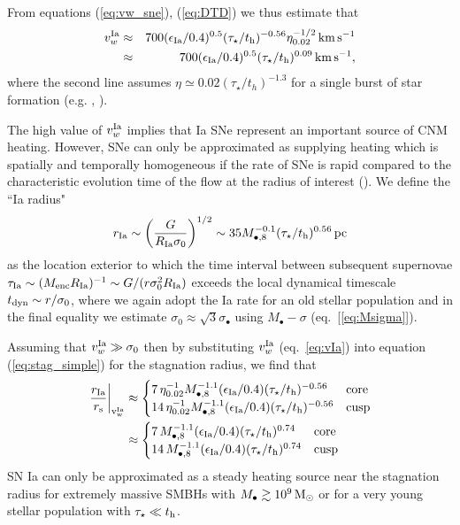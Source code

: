\documentclass[usenatbib,fleqn]{mn2e}
\begin{document}
From equations (\ref{eq:vw_sne}), (\ref{eq:DTD}) we thus estimate that 
  \begin{eqnarray} 
    v_{w}^{\rm Ia} &\approx& 700(\epsilon_{\rm
      Ia}/0.4)^{0.5}(\tau_{\star}/t_{\rm h})^{-0.56}\eta_{0.02}^{-1/2}\,{\rm km
      \,s^{-1}} \nonumber \\
&\approx& 700(\epsilon_{\rm
      Ia}/0.4)^{0.5}(\tau_{\star}/t_{\rm h})^{0.09}\,{\rm km
      \,s^{-1}},
\label{eq:vIa}
  \end{eqnarray}
  where the second line assumes $\eta\simeq 0.02
  (\tau_{\star}/t_h)^{-1.3}$ for a single burst of star formation
  (e.g. , \citealt{Ciotti+91}).

The high value of $v_{w}^{\rm Ia}$ implies that Ia SNe represent an
important source of CNM heating.  However, SNe can only be
approximated as supplying heating which is spatially and temporally
homogeneous if the rate of SNe is rapid compared to the characteristic
evolution time of the flow at the radius of interest
(\citealt{ShcherbakovWong+:2014a}).  We define the ``Ia radius"
  \begin{align}
    r_{\rm Ia} \sim \left(\frac{G}{R_{\rm Ia}\sigma_0}\right)^{1/2} \sim
    35 M_{\bullet,8}^{-0.1}(\tau_{\star}/t_{\rm h})^{0.56}\,{\rm pc}
    \label{eq:rIa}
  \end{align}
  as the location exterior to which the time interval between
  subsequent supernovae $\tau_{\rm Ia} \sim (M_{\rm enc}R_{\rm
    Ia})^{-1} \sim G/(r\sigma_0^{2}R_{\rm Ia})$ exceeds the local
  dynamical timescale $t_{\rm dyn} \sim r/\sigma_0$, where we again
  adopt the Ia rate for an old stellar population and in the final
  equality we estimate $\sigma_0 \approx \sqrt{3}\sigma_{\bullet}$
  using $M_{\bullet}-\sigma$ (eq.~[\ref{eq:Msigma}]).

Assuming that $v_{w}^{\rm Ia} \gg \sigma_0$ then by substituting
$v_{w}^{\rm Ia}$ (eq.~\ref{eq:vIa}) into equation (\ref{eq:stag_simple})
for the stagnation radius, we find that
\begin{align}
  \left.\frac{r_{\rm Ia}}{r_{\rm s}}\right|_{\rm v_{w}^{\rm Ia}}&\approx
  \begin{cases}
    7\, \eta_{0.02}^{-1} M_{\bullet,8}^{-1.1}(\epsilon_{\rm
     Ia}/0.4) (\tau_{\star}/t_{\rm h})^{-0.56}  & {\rm core}\\
    14\, \eta_{0.02}^{-1} M_{\bullet,8}^{-1.1}(\epsilon_{\rm
     Ia}/0.4) (\tau_{\star}/t_{\rm h})^{-0.56} &{\rm cusp}\\
   \end{cases} \nonumber\\
 &\approx 
 \begin{cases}
    7\, M_{\bullet,8}^{-1.1}(\epsilon_{\rm
     Ia}/0.4) (\tau_{\star}/t_{\rm h})^{0.74}  & {\rm core}\\
    14\, M_{\bullet,8}^{-1.1}(\epsilon_{\rm
     Ia}/0.4) (\tau_{\star}/t_{\rm h})^{0.74} &{\rm cusp}\\
   \end{cases}
\label{eq:rIars}
\end{align}
SN Ia can only be approximated as a steady heating source near the stagnation radius for extremely
massive SMBHs with $M_{\bullet} \gtrsim 10^9 \,{\rm M_\odot}$ or for a very
young stellar population with $\tau_{\star} \ll t_{\rm h}$.
\end{document}
